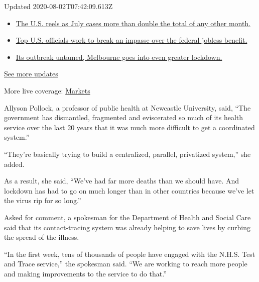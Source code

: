 Updated 2020-08-02T07:42:09.613Z

\begin{itemize}
\tightlist
\item
  \href{https://www.nytimes.com/2020/08/01/world/coronavirus-covid-19.html?action=click\&pgtype=Article\&state=default\&region=MAIN_CONTENT_1\&context=storylines_live_updates\#link-34047410}{The
  U.S. reels as July cases more than double the total of any other
  month.}
\item
  \href{https://www.nytimes.com/2020/08/01/world/coronavirus-covid-19.html?action=click\&pgtype=Article\&state=default\&region=MAIN_CONTENT_1\&context=storylines_live_updates\#link-780ec966}{Top
  U.S. officials work to break an impasse over the federal jobless
  benefit.}
\item
  \href{https://www.nytimes.com/2020/08/01/world/coronavirus-covid-19.html?action=click\&pgtype=Article\&state=default\&region=MAIN_CONTENT_1\&context=storylines_live_updates\#link-2bc8948}{Its
  outbreak untamed, Melbourne goes into even greater lockdown.}
\end{itemize}

\href{https://www.nytimes.com/2020/08/01/world/coronavirus-covid-19.html?action=click\&pgtype=Article\&state=default\&region=MAIN_CONTENT_1\&context=storylines_live_updates}{See
more updates}

More live coverage:
\href{https://www.nytimes.com/live/2020/07/31/business/stock-market-today-coronavirus?action=click\&pgtype=Article\&state=default\&region=MAIN_CONTENT_1\&context=storylines_live_updates}{Markets}

Allyson Pollock, a professor of public health at Newcastle University,
said, ``The government has dismantled, fragmented and eviscerated so
much of its health service over the last 20 years that it was much more
difficult to get a coordinated system.''

``They're basically trying to build a centralized, parallel, privatized
system,'' she added.

As a result, she said, ``We've had far more deaths than we should have.
And lockdown has had to go on much longer than in other countries
because we've let the virus rip for so long.''

Asked for comment, a spokesman for the Department of Health and Social
Care said that its contact-tracing system was already helping to save
lives by curbing the spread of the illness.

``In the first week, tens of thousands of people have engaged with the
N.H.S. Test and Trace service,'' the spokesman said. ``We are working to
reach more people and making improvements to the service to do that.''

